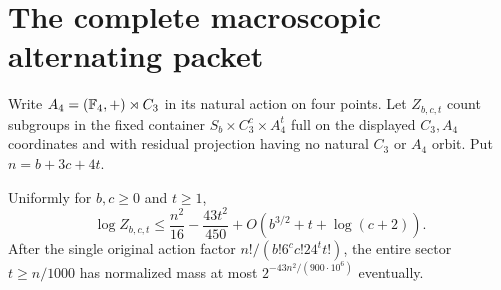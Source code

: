 \section{The complete macroscopic alternating packet}
\label{sec:macro-a4}
Write $A_4=(\mathbb F_4,+)\rtimes C_3$ in its natural action on four
points. Let $Z_{b,c,t}$ count subgroups in the fixed container
$S_b\times C_3^c\times A_4^t$ full on the displayed $C_3,A_4$
coordinates and with residual projection having no natural $C_3$
or $A_4$ orbit. Put $n=b+3c+4t$.

\begin{theorem}
\label{thm:macro-a4}
Uniformly for $b,c\geq0$ and $t\geq1$,
\begin{equation}\label{eq:macro-a4}
 \log Z_{b,c,t}\leq\frac{n^2}{16}-\frac{43t^2}{450}
                         +O(b^{3/2}+t+\log(c+2)).
\end{equation}
After the single original action factor
$n!/(b!6^cc!24^tt!)$, the entire sector $t\geq n/1000$
has normalized mass at most
$2^{-43n^2/(900\cdot10^6)}$ eventually.
\end{theorem}
